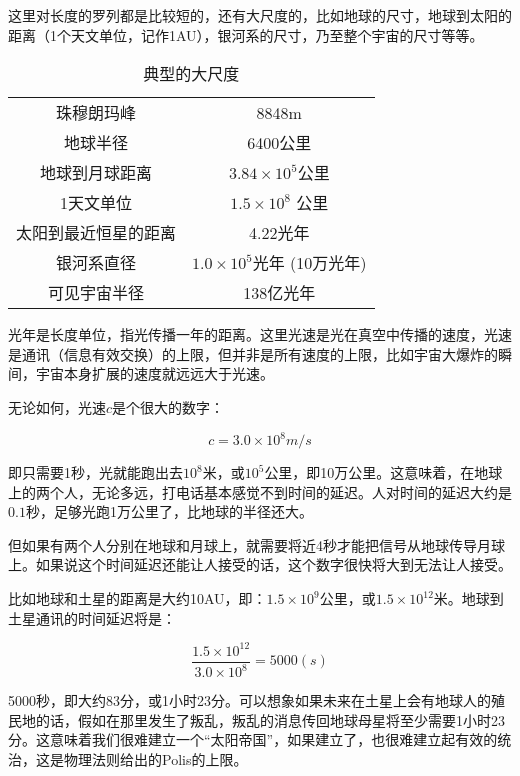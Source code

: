 这里对长度的罗列都是比较短的，还有大尺度的，比如地球的尺寸，地球到太阳的距离（1个天文单位，记作1AU），银河系的尺寸，乃至整个宇宙的尺寸等等。

\begin{table}[htdp]
\caption{典型的大尺度}
\begin{center}
\begin{tabular}{|c|c|}
\hline
珠穆朗玛峰 & 8848m   \\
地球半径 & 6400公里 \\
地球到月球距离 & $3.84 \times 10^5$公里 \\ 
1天文单位 & $1.5 \times 10^8$ 公里 \\
太阳到最近恒星的距离 & 4.22光年 \\
银河系直径 & $1.0 \times 10^5$光年 (10万光年) \\
可见宇宙半径 & 138亿光年 \\
\hline
\end{tabular}
\end{center}
\label{default}
\end{table}%

光年是长度单位，指光传播一年的距离。这里光速是光在真空中传播的速度，光速是通讯（信息有效交换）的上限，但并非是所有速度的上限，比如宇宙大爆炸的瞬间，宇宙本身扩展的速度就远远大于光速。

无论如何，光速$c$是个很大的数字：

\begin{equation}
c = 3.0 \times 10^8 m/s
\end{equation}

即只需要1秒，光就能跑出去$10^8$米，或$10^5$公里，即10万公里。这意味着，在地球上的两个人，无论多远，打电话基本感觉不到时间的延迟。人对时间的延迟大约是$0.1$秒，足够光跑1万公里了，比地球的半径还大。

但如果有两个人分别在地球和月球上，就需要将近4秒才能把信号从地球传导月球上。如果说这个时间延迟还能让人接受的话，这个数字很快将大到无法让人接受。

比如地球和土星的距离是大约10AU，即：$1.5 \times 10^9$公里，或$1.5 \times 10^{12}$米。地球到土星通讯的时间延迟将是：

\begin{equation*}
\frac{1.5 \times 10^{12}}{3.0 \times 10^8 } = 5000(s)
\end{equation*}

5000秒，即大约83分，或1小时23分。可以想象如果未来在土星上会有地球人的殖民地的话，假如在那里发生了叛乱，叛乱的消息传回地球母星将至少需要1小时23分。这意味着我们很难建立一个“太阳帝国”，如果建立了，也很难建立起有效的统治，这是物理法则给出的Polis的上限。

